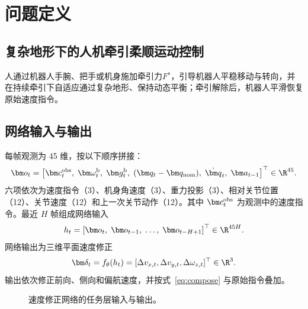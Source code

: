 \section{问题定义}
\subsection{复杂地形下的人机牵引柔顺运动控制}

人通过机器人手腕、把手或机身施加牵引力$F^s$，引导机器人平稳移动与转向，并在持续牵引下自适应通过复杂地形、保持动态平衡；牵引解除后，机器人平滑恢复原始速度指令。

\subsection{网络输入与输出}
每帧观测为 45 维，按以下顺序拼接：
\begin{equation}
\bm o_t=\left[
\bm c_t^{\rm obs},\;
\bm\omega_t^{\rm b},\;
\bm g_t^{\rm b},\;
(\bm q_t-\bm q_{\rm nom}),\;
\dot{\bm q}_t,\;
\bm a_{t-1}
\right]^\top\in\R^{45}.
\label{eq:proprio-observation}
\end{equation}
六项依次为速度指令（3）、机身角速度（3）、重力投影（3）、相对关节位置（12）、关节速度（12）和上一次关节动作（12）。其中 $\bm c_t^{\rm obs}$ 为观测中的速度指令。最近 $H$ 帧组成网络输入
\begin{equation}
h_t=\left[\bm o_t,\;\bm o_{t-1},\;\ldots,\;\bm o_{t-H+1}\right]^\top\in\R^{45H}.
\label{eq:proprio-history}
\end{equation}
网络输出为三维平面速度修正
\begin{equation}
\bm\delta_t=f_\theta(h_t)
=[\Delta v_{x,t},\Delta v_{y,t},\Delta\omega_{z,t}]^\top\in\R^3.
\label{eq:network-io}
\end{equation}
输出依次修正前向、侧向和偏航速度，并按式~\eqref{eq:compose} 与原始指令叠加。

\begin{figure}[htbp]
\centering
{}
\caption{速度修正网络的任务层输入与输出。}
\label{fig:network-io}
\end{figure}

